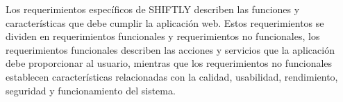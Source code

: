 Los requerimientos específicos de SHIFTLY describen las funciones y
características que debe cumplir la aplicación web. Estos requerimientos se
dividen en requerimientos funcionales y requerimientos no funcionales, los requerimientos funcionales describen las acciones y servicios que la aplicación debe proporcionar al usuario, mientras que los requerimientos no funcionales establecen características relacionadas con la calidad, usabilidad, rendimiento, seguridad y funcionamiento del sistema.
    
    